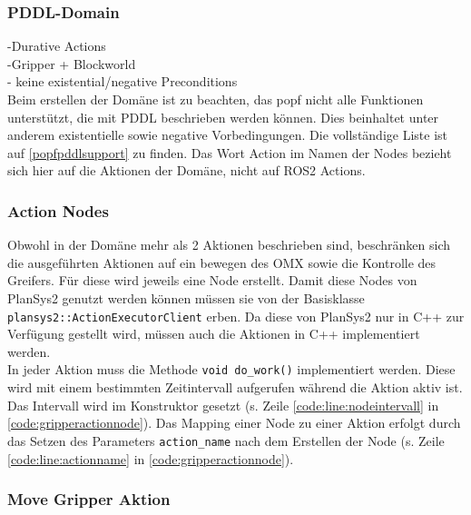 \subsubsection{PDDL-Domain}
-Durative Actions\\
-Gripper + Blockworld\\
- keine existential/negative Preconditions\\
Beim erstellen der Domäne ist zu beachten, das \ac{popf} nicht alle Funktionen unterstützt, die mit PDDL beschrieben werden können. Dies beinhaltet unter anderem existentielle sowie negative Vorbedingungen. Die vollständige Liste ist auf \ref{popfpddlsupport} zu finden. Das Wort Action im Namen der Nodes bezieht sich hier auf die Aktionen der Domäne, nicht auf \ac{ROS2} Actions.
\subsubsection{Action Nodes}
Obwohl in der Domäne mehr als 2 Aktionen beschrieben sind, beschränken sich die ausgeführten Aktionen auf ein bewegen des OMX sowie die Kontrolle des Greifers. Für diese wird jeweils eine Node erstellt. Damit diese Nodes von \ac{PlanSys2} genutzt werden können müssen sie von der Basisklasse \verb|plansys2::ActionExecutorClient| erben. Da diese von \ac{PlanSys2} nur in C++ zur Verfügung gestellt wird, müssen auch die Aktionen in C++ implementiert werden.\\
In jeder Aktion muss die Methode \verb|void do_work()| implementiert werden. Diese wird mit einem bestimmten Zeitintervall aufgerufen während die Aktion aktiv ist. Das Intervall wird im Konstruktor gesetzt (s. Zeile \ref{code:line:nodeintervall} in \ref{code:gripperactionnode}). Das Mapping einer Node zu einer Aktion erfolgt durch das Setzen des Parameters \verb|action_name| nach dem Erstellen der Node (s. Zeile \ref{code:line:actionname} in \ref{code:gripperactionnode}).
\subsubsection{Move Gripper Aktion}
